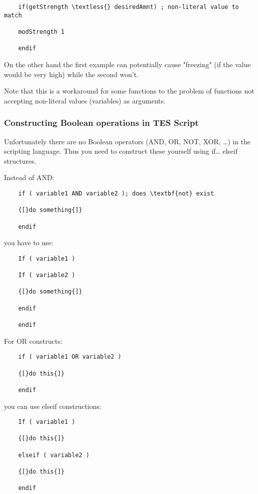 \begin{lstlisting}
	if(getStrength \textless{} desiredAmnt) ; non-literal value to match
	
	modStrength 1
	
	endif
\end{lstlisting}

On the other hand the first example can potentially cause "freezing" (if
the value would be very high) while the second won't.

Note that this is a workaround for some functions to the problem of
functions not accepting non-literal values (variables) as arguments.

\hypertarget{constructing-boolean-operations-in-tes-script}{%
\subsubsection{Constructing Boolean operations in TES
Script}\label{constructing-boolean-operations-in-tes-script}}

Unfortunately there are no Boolean operators (AND, OR, NOT, XOR, \ldots)
in the scripting language. Thus you need to construct these yourself
using if\ldots{} elseif structures.

Instead of AND:

\begin{lstlisting}
	if ( variable1 AND variable2 ); does \textbf{not} exist
	
	{[}do something{]}
	
	endif
\end{lstlisting}
	
you have to use:

\begin{lstlisting}	
	If ( variable1 )
	
	If ( variable2 )
	
	{[}do something{]}
	
	endif
	
	endif
\end{lstlisting}
	
For OR constructs:

\begin{lstlisting}	
	if ( variable1 OR variable2 )
	
	{[}do this{]}
	
	endif
\end{lstlisting}
	
you can use elseif constructions:

\begin{lstlisting}	
	If ( variable1 )
	
	{[}do this{]}
	
	elseif ( variable2 )
	
	{[}do this{]}
	
	endif
\end{lstlisting}